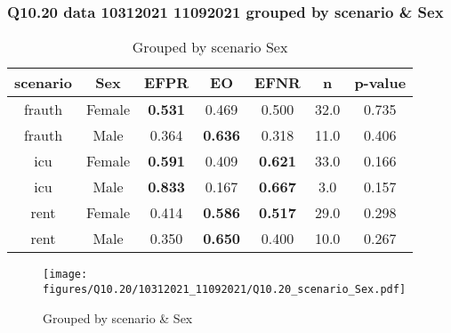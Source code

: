 \subsubsection{Q10.20 data 10312021 11092021 grouped by scenario \& Sex}

\begin{comment}
                      EFPR        EO      EFNR     n    pvalue
(frauth, Female)  0.531250  0.468750  0.500000  32.0  0.735498
(frauth, Male)    0.363636  0.636364  0.318182  11.0  0.405882
(icu, Female)     0.590909  0.409091  0.621212  33.0  0.165625
(icu, Male)       0.833333  0.166667  0.666667   3.0  0.157299
(rent, Female)    0.413793  0.586207  0.517241  29.0  0.298476
(rent, Male)      0.350000  0.650000  0.400000  10.0  0.267257
\end{comment}

\begin{table}[h]
    \centering
    \begin{tabular}{|c|c|c|c|c|c|c|}
        \hline
        scenario & Sex & EFPR & EO & EFNR & n & p-value\\
        \hline
        frauth & Female & \textbf{0.531} & 0.469 & 0.500 & 32.0 & 0.735\\
		frauth & Male & 0.364 & \textbf{0.636} & 0.318 & 11.0 & 0.406\\
		icu & Female & \textbf{0.591} & 0.409 & \textbf{0.621} & 33.0 & 0.166\\
		icu & Male & \textbf{0.833} & 0.167 & \textbf{0.667} & 3.0 & 0.157\\
		rent & Female & 0.414 & \textbf{0.586} & \textbf{0.517} & 29.0 & 0.298\\
		rent & Male & 0.350 & \textbf{0.650} & 0.400 & 10.0 & 0.267\\
		
        \hline
    \end{tabular}
    \caption{Grouped by scenario Sex}
    \label{tab:my_label}
\end{table}
\begin{figure}[h]
    \centering
    \texttt{[image: figures/Q10.20/10312021\_11092021/Q10.20\_scenario\_Sex.pdf]}
    \caption{Grouped by scenario \& Sex}
    \label{fig:my_label}
\end{figure}
